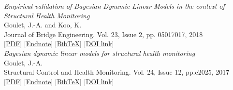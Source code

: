 \noindent \emph{Empirical validation of Bayesian Dynamic Linear Models in the context of Structural Health Monitoring}\\{\small
            Goulet, J.-A. and Koo, K.\\
            Journal of Bridge Engineering. Vol. 23, Issue 2, pp. 05017017, 2018\\}
      [\href{https://www.polymtl.ca/cgm/jagoulet/Site/Papers/Goulet_BDLM_tamar_2017.pdf}{PDF}] [\href{https://www.polymtl.ca/cgm/jagoulet/Site/Papers/Goulet_BDLM_2018.xml}{Endnote}]  [\href{https://www.polymtl.ca/cgm/jagoulet/Site/Papers/Goulet_BDLM_2018.ris}{BibTeX}] [\href{https://doi.org/10.1061/\%28ASCE\%29BE.1943-5592.0001190}{DOI link}] \cite{Goulet2017BDLMEmprical}\\[4pt]

\noindent \emph{Bayesian dynamic linear models for structural health monitoring}\\{\small
            Goulet, J.-A.\\
            Structural Control and Health Monitoring. Vol. 24, Issue 12, pp.e2025, 2017\\}
      [\href{https://www.polymtl.ca/cgm/jagoulet/Site/Papers/Goulet_BDLM_SHM_2017_preprint.pdf}{PDF}] [\href{https://www.polymtl.ca/cgm/jagoulet/Site/Papers/Goulet_BDLM_2017.xml}{Endnote}]  [\href{https://www.polymtl.ca/cgm/jagoulet/Site/Papers/Goulet_BDLM_2017.ris}{BibTeX}] [\href{https://doi.org/10.1002/stc.2035}{DOI link}] \cite{STC:STC2035} \\

 
